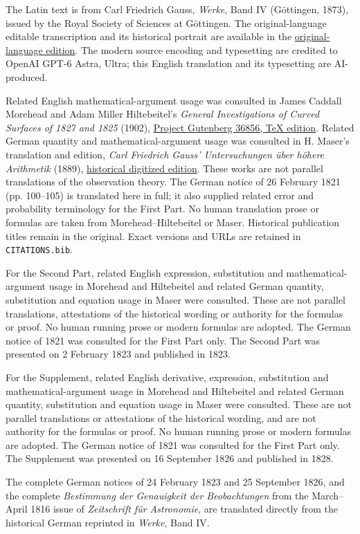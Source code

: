\thispagestyle{empty}\begingroup\fontsize{9}{11}\selectfont\raggedright{}\medskip\noindent The Latin text is from Carl Friedrich Gauss, \textit{Werke}, Band IV (Göttingen, 1873), issued by the Royal Society of Sciences at Göttingen. The original-language editable transcription and its historical portrait are available in the \href{https://github.com/KokunoYumeto/gauss-collected-works/releases/tag/gauss-original-language-2026-10-24}{original-language edition}. The modern source encoding and typesetting are credited to OpenAI GPT-6 Astra, Ultra; this English translation and its typesetting are AI-produced.\par\medskip\noindent Related English mathematical-argument usage was consulted in James Caddall Morehead and Adam Miller Hiltebeitel’s \textit{General Investigations of Curved Surfaces of 1827 and 1825} (1902), \href{https://www.gutenberg.org/ebooks/36856}{Project Gutenberg 36856, TeX edition}. Related German quantity and mathematical-argument usage was consulted in H. Maser’s translation and edition, \textit{Carl Friedrich Gauss’ Untersuchungen über höhere Arithmetik} (1889), \href{https://archive.org/details/carlfriedrichga00gausgoog}{historical digitized edition}. These works are not parallel translations of the observation theory. The German notice of 26 February 1821 (pp. 100--105) is translated here in full; it also supplied related error and probability terminology for the First Part. No human translation prose or formulas are taken from Morehead--Hiltebeitel or Maser. Historical publication titles remain in the original. Exact versions and URLs are retained in \texttt{CITATIONS.bib}.\par\medskip\noindent For the Second Part, related English expression, substitution and mathematical-argument usage in Morehead and Hiltebeitel and related German quantity, substitution and equation usage in Maser were consulted. These are not parallel translations, attestations of the historical wording or authority for the formulas or proof. No human running prose or modern formulas are adopted. The German notice of 1821 was consulted for the First Part only. The Second Part was presented on 2 February 1823 and published in 1823.\par\medskip\noindent For the Supplement, related English derivative, expression, substitution and mathematical-argument usage in Morehead and Hiltebeitel and related German quantity, substitution and equation usage in Maser were consulted. These are not parallel translations or attestations of the historical wording, and are not authority for the formulas or proof. No human running prose or modern formulas are adopted. The German notice of 1821 was consulted for the First Part only. The Supplement was presented on 16 September 1826 and published in 1828.\par\medskip\noindent The complete German notices of 24 February 1823 and 25 September 1826, and the complete \textit{Bestimmung der Genauigkeit der Beobachtungen} from the March--April 1816 issue of \textit{Zeitschrift für Astronomie}, are translated directly from the historical German reprinted in \textit{Werke}, Band IV. 